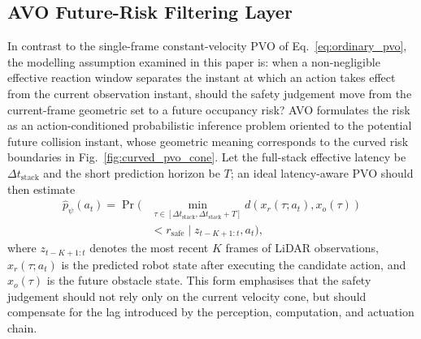 \documentclass[10pt,a4paper,twocolumn]{article}
\begin{document}
\subsection{AVO Future-Risk Filtering Layer}

\begin{samepage}
In contrast to the single-frame constant-velocity PVO of Eq.~\ref{eq:ordinary_pvo}, the modelling assumption examined in this paper is: when a non-negligible effective reaction window separates the instant at which an action takes effect from the current observation instant, should the safety judgement move from the current-frame geometric set to a future occupancy risk? AVO formulates the risk as an action-conditioned probabilistic inference problem oriented to the potential future collision instant, whose geometric meaning corresponds to the curved risk boundaries in Fig.~\ref{fig:curved_pvo_cone}. Let the full-stack effective latency be $\Delta t_{\mathrm{stack}}$ and the short prediction horizon be $T$; an ideal latency-aware PVO should then estimate
\begin{equation}
\begin{aligned}
    \hat{p}_{\psi}(a_t)=\Pr(&\min_{\tau\in[\Delta t_{\mathrm{stack}},\Delta t_{\mathrm{stack}}+T]}
    d(x_r(\tau;a_t),x_o(\tau)) \\
    &< r_{\mathrm{safe}} \mid z_{t-K+1:t}, a_t),
\end{aligned}
\label{eq:delay_pvo}
\end{equation}
where $z_{t-K+1:t}$ denotes the most recent $K$ frames of LiDAR observations, $x_r(\tau;a_t)$ is the predicted robot state after executing the candidate action, and $x_o(\tau)$ is the future obstacle state. This form emphasises that the safety judgement should not rely only on the current velocity cone, but should compensate for the lag introduced by the perception, computation, and actuation chain.
\end{samepage}
\end{document}

